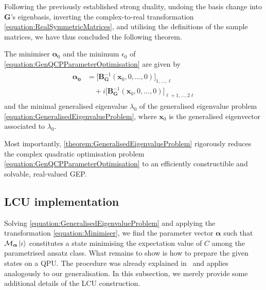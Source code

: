 \documentclass[10pt,conference]{IEEEtran}
\begin{document}
Following the previously established strong duality, undoing the basis change into $\bm{G}$'s eigenbasis, inverting the complex-to-real transformation \eqref{equation:RealSymmetricMatrices}, and utilising the definitions of the sample matrices, we have thus concluded the following theorem.
\begin{theorem}\label{theorem:GeneralisedEigenvalueProblem}
    The minimiser $\bm{\alpha}_{0}$ and the minimum $\epsilon_{0}$ of \eqref{equation:GenQCPParameterOptimisation} are given by
    \begin{align}\label{equation:Minimiser}
        \begin{split}
            \bm{\alpha_{0}} &= \big[\bm{B}_{\bm{G}}^{-1}(\bm{x}_{0}, 0, \ldots, 0)\big]_{1, \ldots, \ell} \\
            &\quad + i \big[\bm{B}_{\bm{G}}^{-1}(\bm{x}_{0}, 0, \ldots, 0)\big]_{\ell + 1, \ldots, 2 \ell}
        \end{split}
    \end{align}
    and the minimal generalised eigenvalue $\lambda_{0}$ of the generalised eigenvalue problem \eqref{equation:GeneralisedEigenvalueProblem}, where $\bm{x}_{0}$ is the generalised eigenvector associated to $\lambda_{0}$.
\end{theorem}

Most importantly, \autoref{theorem:GeneralisedEigenvalueProblem} rigorously reduces the complex quadratic optimisation problem \eqref{equation:GenQCPParameterOptimisation} to an efficiently constructible and solvable, real-valued GEP.

\subsection{\label{subsection:LCUImplementation}LCU implementation}

Solving \eqref{equation:GeneralisedEigenvalueProblem} and applying the transformation \eqref{equation:Minimiser}, we find the parameter vector $\bm{\alpha}$ such that $\mathcal{M}_{\bm{\alpha}} \ket{\iota}$ constitutes a state minimising the expectation value of $C$ among the parametrised ansatz class.
What remains to show is how to prepare the given states on a QPU.
The procedure was already explained in~\cite{Binkowski2025FromBarrenPlateausThroughFertileValleysConicExtensionsOfParameterisedQuantumCircuits} and applies analogously to our generalisation.
In this subsection, we merely provide some additional details of the LCU construction.
\end{document}
